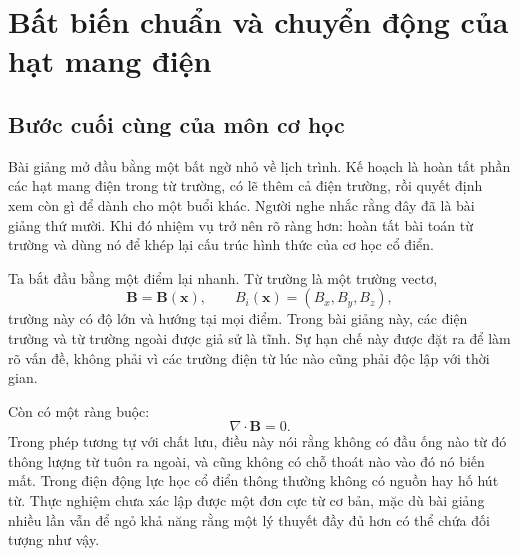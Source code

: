 \chapter{Bất biến chuẩn và chuyển động của hạt mang điện}


\section{Bước cuối cùng của môn cơ học}

Bài giảng mở đầu bằng một bất ngờ nhỏ về lịch trình. Kế hoạch là hoàn tất phần các hạt mang điện trong từ trường, có lẽ thêm cả điện trường, rồi quyết định xem còn gì để dành cho một buổi khác. Người nghe nhắc rằng đây đã là bài giảng thứ mười. Khi đó nhiệm vụ trở nên rõ ràng hơn: hoàn tất bài toán từ trường và dùng nó để khép lại cấu trúc hình thức của cơ học cổ điển.

Ta bắt đầu bằng một điểm lại nhanh. Từ trường là một trường vectơ,
\begin{equation}
  \mathbf B=\mathbf B(\mathbf x),
  \qquad
  B_i(\mathbf x)=(B_x,B_y,B_z),
\end{equation}
trường này có độ lớn và hướng tại mọi điểm. Trong bài giảng này, các điện trường và từ trường ngoài được giả sử là tĩnh. Sự hạn chế này được đặt ra để làm rõ vấn đề, không phải vì các trường điện từ lúc nào cũng phải độc lập với thời gian.

Còn có một ràng buộc:
\begin{equation}
  \nabla\cdot\mathbf B=0.
\end{equation}
Trong phép tương tự với chất lưu, điều này nói rằng không có đầu ống nào từ đó thông lượng từ tuôn ra ngoài, và cũng không có chỗ thoát nào vào đó nó biến mất. Trong điện động lực học cổ điển thông thường không có nguồn hay hố hút từ. Thực nghiệm chưa xác lập được một đơn cực từ cơ bản, mặc dù bài giảng nhiều lần vẫn để ngỏ khả năng rằng một lý thuyết đầy đủ hơn có thể chứa đối tượng như vậy.

